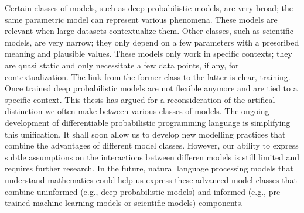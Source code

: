 Certain classes of models, such as deep probabilistic models, are very broad; the same parametric model can represent various phenomena. These models are relevant when large datasets contextualize them. Other classes, such as scientific models, are very narrow; they only depend on a few parameters with a prescribed meaning and plausible values. These models only work in specific contexts; they are quasi static and only necessitate a few data points, if any, for contextualization. The link from the former class to the latter is clear, training. Once trained deep probabilistic models are not flexible anymore and are tied to a specific context. This thesis has argued for a reconsideration of the artifical distinction we often make between various classes of models. The ongoing development of differentiable probabilistic programming language is simplifying this unification. It shall soon allow us to develop new modelling practices that combine the advantages of different model classes. However, our ability to express subtle assumptions on the interactions between differen models is still limited and requires further research. In the future, natural language processing models that understand mathematics could help us express these advanced model classes that combine uninformed (e.g., deep probabilistic models) and informed (e.g., pre-trained machine learning models or scientific models) components. 


